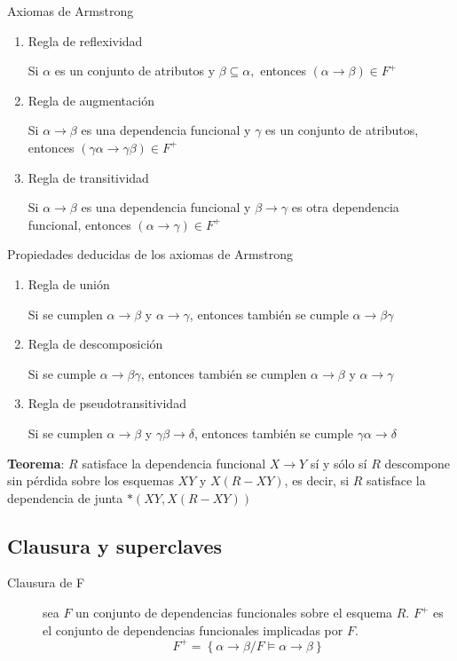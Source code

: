 \documentclass[a4paper, twoside]{article}
\begin{document}
\begin{definicion}[0.9\textwidth]{Axiomas de Armstrong}
	\begin{enumerate}
		\item Regla de reflexividad

		Si $\alpha$ es un conjunto de atributos y $\beta\subseteq\alpha,$ entonces $(\alpha\to\beta)\in F^{+}$

		\item Regla de augmentación

		Si $\alpha \to \beta$ es una dependencia funcional y $\gamma$ es un conjunto de atributos, entonces $(\gamma \alpha \to \gamma \beta) \in F^{+}$

		\item Regla de transitividad

		Si $\alpha \to \beta$ es una dependencia funcional y $\beta \to \gamma$ es otra dependencia funcional, entonces $(\alpha \to \gamma) \in F^{+}$
	\end{enumerate}
\end{definicion}

\begin{propiedades}[0.9\textwidth]{Propiedades deducidas de los axiomas de Armstrong}
	\begin{enumerate}
		\item Regla de unión

		Si se cumplen $\alpha\to\beta$ y $\alpha\to\gamma$, entonces también se cumple $\alpha\to\beta\gamma$

		\item Regla de descomposición

		Si se cumple $\alpha\to\beta\gamma$, entonces también se cumplen $\alpha\to\beta$ y $\alpha\to\gamma$

		\item Regla de pseudotransitividad

		Si se cumplen $\alpha\to\beta$ y $\gamma\beta\to\delta$, entonces también se cumple $\gamma\alpha\to\delta$
	\end{enumerate}
\end{propiedades}

\textbf{Teorema}: $R$ satisface la dependencia funcional $X\to Y$ sí y sólo sí $R$ descompone sin pérdida sobre los esquemas $XY$ y $X(R-XY)$, es decir, si $R$ satisface la dependencia de junta $*\left( XY, X(R-XY) \right)$

\subsection{Clausura y superclaves}
\begin{description}
	\item[Clausura de F] sea $F$ un conjunto de dependencias funcionales sobre el esquema $R$. $F^{+}$ es el conjunto de dependencias funcionales implicadas por $F$.
	\[
		F^{+}=\left\{ \alpha\to\beta/F\vDash\alpha\to\beta\right\} 
	\]
\end{description}
\end{document}
